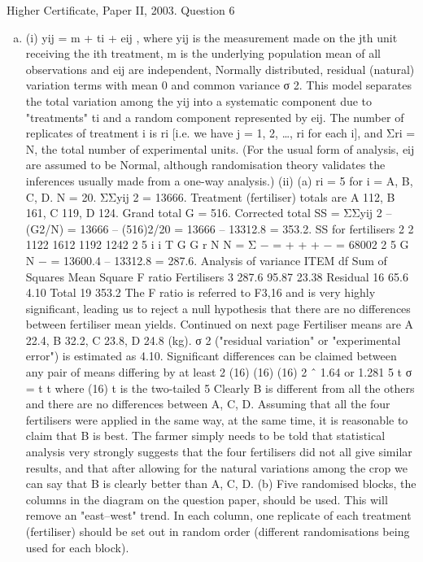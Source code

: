 \documentclass[a4paper,12pt]{article}
\begin{document}
Higher Certificate, Paper II, 2003. Question 6
\begin{enumerate}[(a)]
\item (i) yij = m + ti + eij ,
where yij is the measurement made on the jth unit receiving the ith treatment,
m is the underlying population mean of all observations and {eij} are
independent, Normally distributed, residual (natural) variation terms with
mean 0 and common variance σ 2.
This model separates the total variation among the {yij} into a systematic
component due to "treatments" ti and a random component represented by eij.
The number of replicates of treatment i is ri [i.e. we have j = 1, 2, …, ri for
each i], and Σri = N, the total number of experimental units.
(For the usual form of analysis, {eij} are assumed to be Normal, although
randomisation theory validates the inferences usually made from a one-way
analysis.)
(ii) (a) ri = 5 for i = A, B, C, D. N = 20. ΣΣyij
2 = 13666.
Treatment (fertiliser) totals are A 112, B 161, C 119, D 124.
Grand total G = 516.
Corrected total SS = ΣΣyij
2 – (G2/N) = 13666 – {(516)2/20}
= 13666 – 13312.8 = 353.2.
SS for fertilisers
2 2 1122 1612 1192 1242 2
5
i
i
T G G
r N N
= Σ − = + + + −
=
68002 2
5
G
N
− = 13600.4 – 13312.8 = 287.6.
Analysis of variance
ITEM df Sum of Squares Mean Square F ratio
Fertilisers 3 287.6 95.87 23.38
Residual 16 65.6 4.10
Total 19 353.2
The F ratio is referred to F3,16 and is very highly significant, leading us
to reject a null hypothesis that there are no differences between
fertiliser mean yields.
Continued on next page
Fertiliser means are A 22.4, B 32.2, C 23.8, D 24.8 (kg).
σ 2 ("residual variation" or "experimental error") is estimated as 4.10.
Significant differences can be claimed between any pair of means
differing by at least
2
(16) (16) (16)
2 ˆ 1.64 or 1.281
5
t σ = t t where (16) t
is the two-tailed 5%
Clearly B is different from all the others and there are no differences
between A, C, D. Assuming that all the four fertilisers were applied in
the same way, at the same time, it is reasonable to claim that B is best.
The farmer simply needs to be told that statistical analysis very
strongly suggests that the four fertilisers did not all give similar results,
and that after allowing for the natural variations among the crop we
can say that B is clearly better than A, C, D.
(b) Five randomised blocks, the columns in the diagram on the question
paper, should be used. This will remove an "east–west" trend. In each
column, one replicate of each treatment (fertiliser) should be set out in
random order (different randomisations being used for each block).
\end{enumerate}
\end{document}
